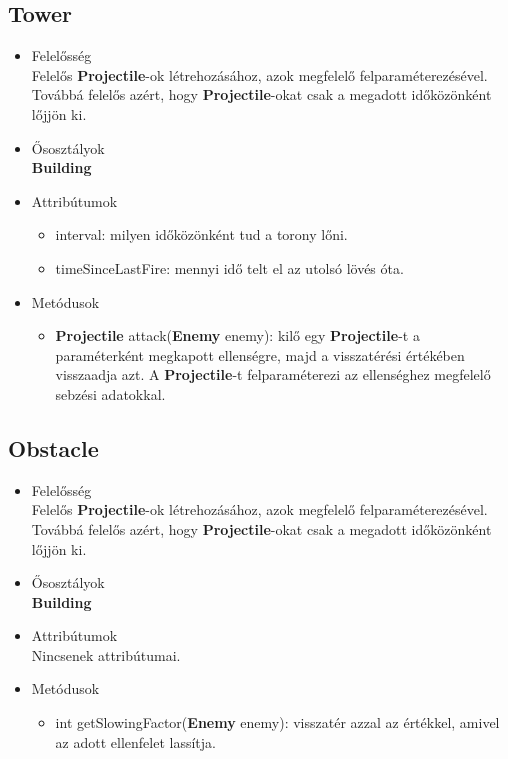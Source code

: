 \subsection{Tower}
\begin{itemize}
\item Felelősség\\
Felelős \textbf{Projectile}-ok létrehozásához, azok megfelelő felparaméterezésével. Továbbá felelős azért, hogy \textbf{Projectile}-okat csak a megadott időközönként lőjjön ki.
\item Ősosztályok\\
\textbf{Building}
\item Attribútumok
	\begin{itemize}
		\item interval: milyen időközönként tud a torony lőni.
		\item timeSinceLastFire: mennyi idő telt el az utolsó lövés óta.
	\end{itemize}
\item Metódusok
	\begin{itemize}
		\item \textbf{Projectile} attack(\textbf{Enemy} enemy): kilő egy \textbf{Projectile}-t a paraméterként megkapott ellenségre, majd a visszatérési értékében visszaadja azt. A \textbf{Projectile}-t felparaméterezi az ellenséghez megfelelő sebzési adatokkal.
	\end{itemize}
\end{itemize}

\subsection{Obstacle}
\begin{itemize}
\item Felelősség\\
Felelős \textbf{Projectile}-ok létrehozásához, azok megfelelő felparaméterezésével. Továbbá felelős azért, hogy \textbf{Projectile}-okat csak a megadott időközönként lőjjön ki.
\item Ősosztályok\\
\textbf{Building}
\item Attribútumok\\
		Nincsenek attribútumai.
\item Metódusok
	\begin{itemize}
		\item int getSlowingFactor(\textbf{Enemy} enemy): visszatér azzal az értékkel, amivel az adott ellenfelet lassítja.
	\end{itemize}
\end{itemize}


